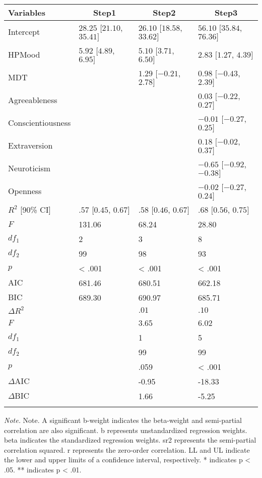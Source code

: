 \documentclass[man,floatsintext]{apa6}
\theoremstyle{definition}
\theoremstyle{definition}
\theoremstyle{definition}
\theoremstyle{remark}
\begin{document}
\begin{table}[tbp]
\begin{center}
\begin{threeparttable}
\caption{\label{tab:unnamed-chunk-2}}
\small{
\begin{tabular}{llll}
\toprule
Variables & \multicolumn{1}{c}{Step1} & \multicolumn{1}{c}{Step2} & \multicolumn{1}{c}{Step3}\\
\midrule
Intercept & $28.25$ $[21.10$, $35.41]$ & $26.10$ $[18.58$, $33.62]$ & $56.10$ $[35.84$, $76.36]$\\
HPMood & $5.92$ $[4.89$, $6.95]$ & $5.10$ $[3.71$, $6.50]$ & $2.83$ $[1.27$, $4.39]$\\
MDT &  & $1.29$ $[-0.21$, $2.78]$ & $0.98$ $[-0.43$, $2.39]$\\
Agreeableness &  &  & $0.03$ $[-0.22$, $0.27]$\\
Conscientiousness &  &  & $-0.01$ $[-0.27$, $0.25]$\\
Extraversion &  &  & $0.18$ $[-0.02$, $0.37]$\\
Neuroticism &  &  & $-0.65$ $[-0.92$, $-0.38]$\\
Openness &  &  & $-0.02$ $[-0.27$, $0.24]$\\
$R^2$ [90\% CI] & $.57$ $[0.45$, $0.67]$ & $.58$ $[0.46$, $0.67]$ & $.68$ $[0.56$, $0.75]$\\
$F$ & 131.06 & 68.24 & 28.80\\
$df_1$ & 2 & 3 & 8\\
$df_2$ & 99 & 98 & 93\\
$p$ & < .001 & < .001 & < .001\\
$\mathrm{AIC}$ & 681.46 & 680.51 & 662.18\\
$\mathrm{BIC}$ & 689.30 & 690.97 & 685.71\\
$\Delta R^2$ &  & $.01$ & $.10$\\
$F$ &  & 3.65 & 6.02\\
$df_1$ &  & 1 & 5\\
$df_2$ &  & 99 & 99\\
$p$ &  & .059 & < .001\\
$\Delta \mathrm{AIC}$ &  & -0.95 & -18.33\\
$\Delta \mathrm{BIC}$ &  & 1.66 & -5.25\\
\bottomrule
\addlinespace
\end{tabular}
}
\begin{tablenotes}[para]
\normalsize{\textit{Note.} Note. A significant b-weight indicates the beta-weight and semi-partial correlation are also significant. b represents unstandardized regression weights. beta indicates the standardized regression weights. sr2 represents the semi-partial correlation squared. r represents the zero-order correlation. LL and UL indicate the lower and upper limits of a confidence interval, respectively.
* indicates p < .05. ** indicates p < .01.
}
\end{tablenotes}
\end{threeparttable}
\end{center}
\end{table}
\end{document}
